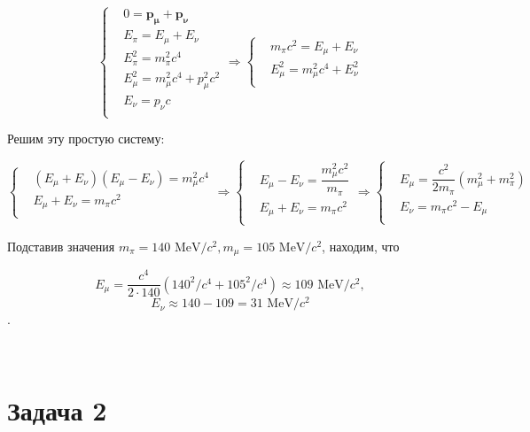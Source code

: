 \documentclass[12pt]{article}
\newcommand{\te}{\ensuremath{\Rightarrow}}
\newcommand{\x}{\cdot}
\begin{document}
\begin{equation}
\left\{
\begin{aligned}
&0 = \mathbf{p_{\mu} }+ \mathbf{p_{\nu}} \\
& E_\pi = E_\mu + E_\nu \\
&E_{\pi}^2 = m_\pi^2c^4 \\
&E_{\mu}^2 = m_\mu^2c^4 + p_\mu^2c^2 \\
&E_{\nu} =  p_\nu c \\
\end{aligned}
\right.
\te
\left\{
\begin{aligned}
&m_\pi c^2 = E_\mu + E_\nu \\
&E_{\mu}^2 = m_\mu^2c^4 + E_{\nu}^2 \\
\end{aligned}
\right.
\end{equation}

Решим эту простую систему:

$$ 
\left\{
\begin{aligned}
& (E_\mu + E_\nu)(E_\mu - E_\nu) = m_\mu^2c^4 \\
&E_\mu + E_\nu = m_\pi c^2  \\
\end{aligned}
\right.
\te 
\left\{
\begin{aligned}
& E_\mu - E_\nu = \dfrac{m_\mu^2c^2}{m_\pi} \\
&E_\mu + E_\nu = m_\pi c^2  \\
\end{aligned}
\right.
\te 
\left\{
\begin{aligned}
& E_\mu = \dfrac{c^2}{2m_\pi}\left( m^2_\mu+ m^2_\pi \right)  \\
& E_\nu = m_\pi c^2 - E_\mu \\
\end{aligned}
\right.
$$

Подставив значения $ m_\pi = 140 \text{ MeV}/c^2, m_\mu = 105 \text{ MeV}/c^2 $, находим, что 

$$ E_\mu = \dfrac{c^4}{2\x140}(140^2/c^4 + 105^2/c^4) \approx 109 \text{ MeV}/c^2, $$
$$ E_\nu \approx 140 - 109 = 31 \text{ MeV}/c^2 $$.

\begin{center}
	{} \\
\end{center} 

\section{Задача 2}
\end{document}
